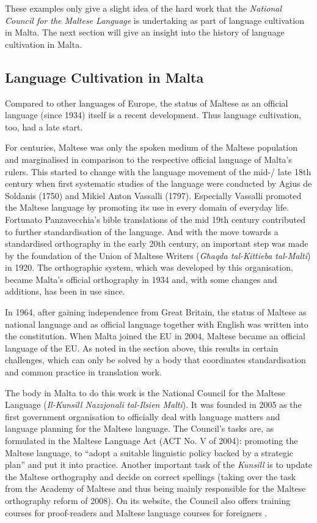 \documentclass[]{../../metanetpaper}
\begin{document}
\begin{multicols}{2}
These examples only give a slight idea of the hard work that the \emph{National Council for the Maltese Language} is undertaking as part of language cultivation in Malta. The next section will give an insight into the history of language cultivation in Malta.

\subsection{Language Cultivation in Malta}

Compared to other languages of Europe, the status of Maltese as an official language (since 1934) itself is a recent development. Thus language cultivation, too, had a late start. 

For centuries, Maltese was only the spoken medium of the Maltese population and marginalised in comparison to the respective official language of Malta's rulers. This started to change with the language movement of the mid-/ late 18th century when first systematic studies of the language were conducted by Agius de Soldanis (1750) and Mikiel Anton Vassalli (1797). Especially Vassalli promoted the Maltese language by promoting its use in every domain of everyday life. Fortunato Panzavecchia's bible translations of the mid 19th century contributed to further standardisation of the language. And with the move towards a standardised orthography in the early 20th century, an important step was made by the foundation of the Union of Maltese Writers (\emph{Għaqda tal-Kittieba tal-Malti}) in 1920. The orthographic system, which was developed by this organisation, became Malta's official orthography in 1934 and, with some changes and additions, has been in use since.

In 1964, after gaining independence from Great Britain, the status of Maltese as national language and as official language together with English was written into the constitution. When Malta joined the EU in 2004, Maltese became an official language of the EU. As noted in the section above, this results in certain challenges, which can only be solved by a body that coordinates standardisation and common practice in translation work.

The body in Malta to do this work is the National Council for the Maltese Language (\emph{Il-Kunsill Nazzjonali tal-Ilsien Malti}). It was founded in 2005 as the first government organisation to officially deal with language matters and language planning for the Maltese language. The Council's tasks are, as formulated in the Maltese Language Act (ACT No. V of 2004): promoting the Maltese language, to ``adopt a suitable linguistic policy backed by a strategic plan'' and put it into practice. Another important task of the \emph{Kunsill} is to update the Maltese orthography and decide on correct spellings (taking over the task from the Academy of Maltese and thus being mainly responsible for the Maltese orthography reform of 2008). On its website, the Council also offers training courses for proof-readers and Maltese language courses for foreigners \cite{Kunsill1}. 


\end{multicols}
\end{document}
